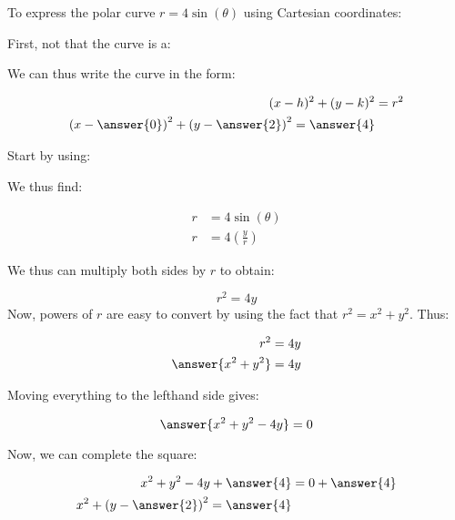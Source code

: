 \documentclass{ximera}
\author{Jim Talamo }
\begin{document}
\begin{exercise}

To express the polar curve $r= 4\sin(\theta)$ using Cartesian coordinates:

First, not that the curve is a:

\begin{multipleChoice}
\end{multipleChoice}

We can thus write the curve in the form:

\begin{align*}
(x-h)^2+(y-k)^2&=r^2\\
\left(x- \answer{0}\right)^2+\left(y-\answer{2 }\right)^2 = \answer{4 }
\end{align*}

\begin{hint}
Start by using:

\begin{multipleChoice}
\end{multipleChoice}

We thus find:

\begin{align*}
r &= 4\sin(\theta) \\
r & = 4 \left(\frac{y}{r} \right)
\end{align*}

\begin{question}
We thus can multiply both sides by $r$ to obtain:

\[
r^2 =4y
\]
Now, powers of $r$ are easy to convert by using the fact that $r^2 = x^2+y^2$.  Thus:

\begin{align*}
r^2 &=4y\\
\answer{x^2+y^2} &= 4y
\end{align*}

Moving everything to the lefthand side gives:

\[
\answer{x^2+y^2-4y} = 0
\]

\begin{question}
Now, we can complete the square:

\begin{align*}
x^2+y^2-4y +\answer{4} &= 0 + \answer{4} \\
x^2 + \left(y- \answer{2}\right)^2 = \answer{4}
\end{align*}
\end{question}
\end{question}

\end{hint}

\end{exercise}
\end{document}
